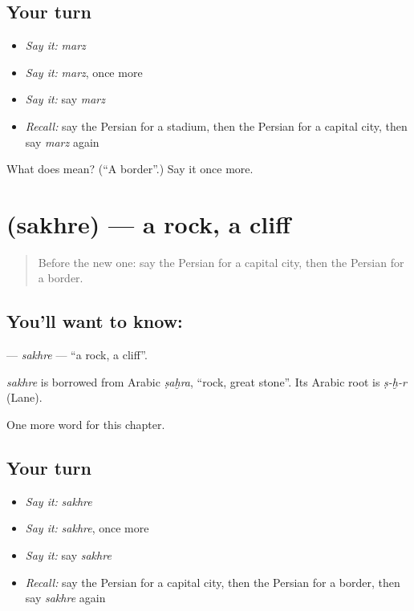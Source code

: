\subsection*{Your turn}
\begin{itemize}
\raggedright
  \item \emph{Say it:} \emph{marz}
  \item \emph{Say it:} \emph{marz}, once more
  \item \emph{Say it:} say \emph{marz}
  \item \emph{Recall:} say the Persian for a stadium, then the Persian for a capital city, then say \emph{marz} again
\end{itemize}

\begin{tcolorbox}[breakable,colback=teal!4,colframe=teal!35!black,title={Before you move on}]
What does  mean? (\textquotedblleft{}A border\textquotedblright{}.) Say it once more.
\end{tcolorbox}
\section[\texorpdfstring{\fa{صخره} (sakhre)}{صخره (sakhre)}]{ (sakhre) — a rock, a cliff}

\label{lesson:FA-C267-sakhre}



\begin{quote}
Before the new one: say the Persian for a capital city, then the Persian for a border.
\end{quote}

\subsection*{You'll want to know: }
\textbf{} — \emph{sakhre} — \textquotedblleft{}a rock, a cliff\textquotedblright{}.

\begin{cousinweb}
\emph{sakhre} is borrowed from Arabic \emph{ṣaḫra}, \textquotedblleft{}rock, great stone\textquotedblright{}. Its Arabic root is \emph{ṣ-ḫ-r} (Lane).
\end{cousinweb}

\begin{grammarlens}[title={What you've built}]
One more word for this chapter.
\end{grammarlens}

\subsection*{Your turn}
\begin{itemize}
\raggedright
  \item \emph{Say it:} \emph{sakhre}
  \item \emph{Say it:} \emph{sakhre}, once more
  \item \emph{Say it:} say \emph{sakhre}
  \item \emph{Recall:} say the Persian for a capital city, then the Persian for a border, then say \emph{sakhre} again
\end{itemize}

